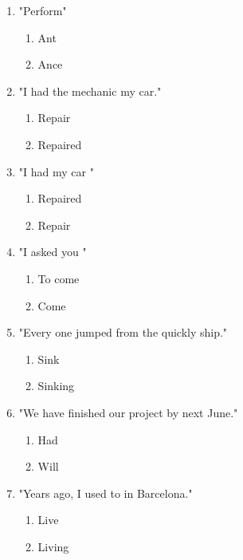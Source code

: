 \documentclass[11pt,a4paper]{article}
\begin{document}
\begin{enumerate}
    \item "Perform\underline{\hspace{2cm}}"
    \begin{enumerate}[label=\alph*.] \item Ant \item Ance \end{enumerate}

    \item "I had the mechanic \underline{\hspace{2cm}} my car."
    \begin{enumerate}[label=\alph*.] \item Repair \item Repaired \end{enumerate}

    \item "I had my car \underline{\hspace{2cm}}"
    \begin{enumerate}[label=\alph*.] \item Repaired \item Repair \end{enumerate}

    \item "I asked you \underline{\hspace{2cm}}"
    \begin{enumerate}[label=\alph*.] \item To come \item Come \end{enumerate}

    \item "Every one jumped from the quickly \underline{\hspace{2cm}} ship."
    \begin{enumerate}[label=\alph*.] \item Sink \item Sinking \end{enumerate}

    \item "We \underline{\hspace{2cm}} have finished our project by next June."
    \begin{enumerate}[label=\alph*.] \item Had \item Will \end{enumerate}

    \item "Years ago, I used to \underline{\hspace{2cm}} in Barcelona."
    \begin{enumerate}[label=\alph*.] \item Live \item Living \end{enumerate}


\end{enumerate}
\end{document}
